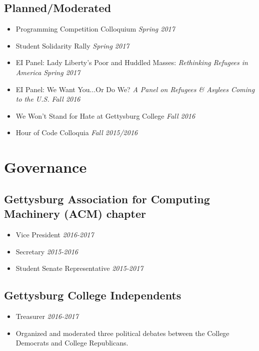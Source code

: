 \documentclass[11pt]{article}
\begin{document}
\subsection*{Planned/Moderated}
\begin{itemize}[noitemsep]
	\item Programming Competition Colloquium \hfill \textit{Spring 2017}
	\item Student Solidarity Rally \hfill \textit{Spring 2017}
	\item EI Panel: Lady Liberty's Poor and Huddled Masses: \textit{Rethinking Refugees in America} \hfill \textit{Spring 2017}
	\item EI Panel: We Want You...Or Do We? \textit{A Panel on Refugees \& Asylees Coming to the U.S.} \hfill \textit{Fall 2016}
	\item We Won't Stand for Hate at Gettysburg College \hfill \textit{Fall 2016}
	\item Hour of Code Colloquia \hfill \textit{Fall 2015/2016}
\end{itemize}

\section*{Governance}
\subsection*{Gettysburg Association for Computing Machinery (ACM) chapter}
\begin{itemize}[noitemsep]
	\item Vice President \hfill \textit{2016-2017}
	\item Secretary \hfill \textit{2015-2016}
	\item Student Senate Representative \hfill \textit{2015-2017}
\end{itemize}
 
\subsection*{Gettysburg College Independents} 
\begin{itemize}[noitemsep]
	\item Treasurer \hfill \textit{2016-2017}
    \item Organized and moderated three political debates between the College Democrats and College Republicans. 
\end{itemize}
\end{document}
